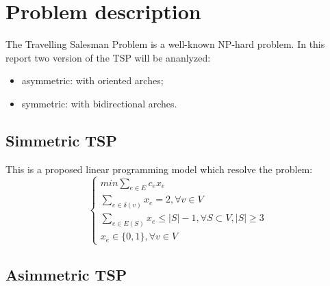 \chapter{Problem description}
The Travelling Salesman Problem is a well-known NP-hard problem.
In this report two version of the TSP will be ananlyzed:
\begin{itemize}
  \item asymmetric: with oriented arches;
  \item symmetric: with bidirectional arches.
\end{itemize}

\section{Simmetric TSP}
This is a proposed linear programming model which resolve the problem:
\[
\begin{cases}
  min \sum_{ e\in E } c_ex_e \\
  \sum_{e\in \delta (v) } x_e = 2, \forall v \in V \\
  \sum_{e\in E(S) } x_e \le |S|-1, \forall S \subset V, |S| \ge 3 \\
  x_e \in \{0,1\}, \forall v \in V
\end{cases}
\]

\section{Asimmetric TSP}
